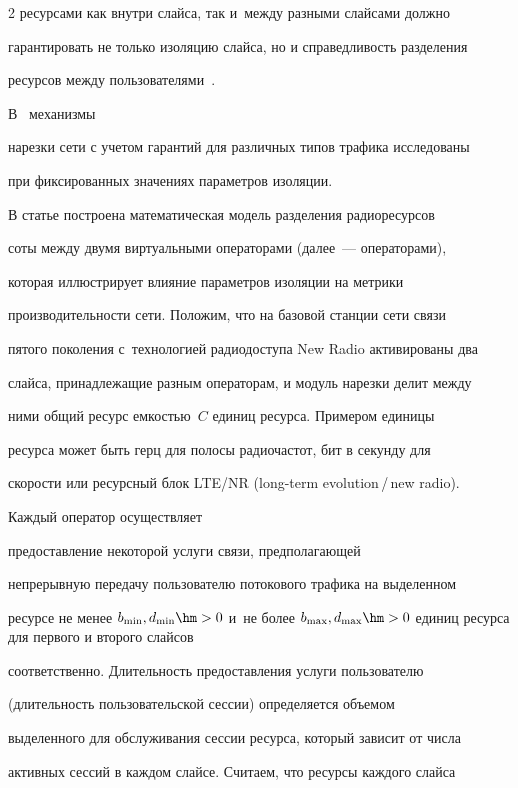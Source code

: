 \begin{multicols}{2}
ресурсами как внутри слайса, так и~меж\-ду разными слайсами должно 


гарантировать не только изоляцию слайса, но и справедливость разделения 


ресурсов между пользователями~\cite{8-mos}. 





В~\cite{9-mos} механизмы 


нарезки сети с учетом гарантий для различных типов трафика исследованы 


при фиксированных значениях параметров изоляции.


  


  В статье построена математическая модель разделения радиоресурсов 


соты между двумя виртуальными операторами (далее~--- операторами), 


которая иллюстрирует влияние параметров изоляции на мет\-рики 


производительности сети. Положим, что на базовой станции сети связи 


пятого поколения с~технологией радиодоступа New Radio активированы два 


слайса, принадлежащие разным операторам, и модуль нарезки делит между 


ними общий ресурс ем\-костью~$C$  единиц ресурса. Примером единицы 


ресурса может быть герц для полосы радиочастот, бит в секунду для 


ско\-рости или ресурсный блок LTE/NR (long-term evolution\,/\,new radio). 


Каждый оператор осуществляет  


предостав\-ле\-ние некоторой услуги связи, пред\-по\-ла\-га\-ющей 


непрерывную передачу пользователю потокового трафика на выделенном 


ресурсе не менее $b_{\min}, d_{\min}\hm >0$ и~не более $b_{\max}, 


d_{\max}\hm>0$ единиц ресурса для первого и второго слайсов 


соответственно. Длительность предостав\-ле\-ния услуги пользователю 


(длительность пользовательской сессии) определяется объемом 


выделенного для обслуживания сессии ресурса, который зависит от числа 


активных сессий в каж\-дом слайсе. Считаем, что ресурсы каждого слайса 



\end{multicols}
